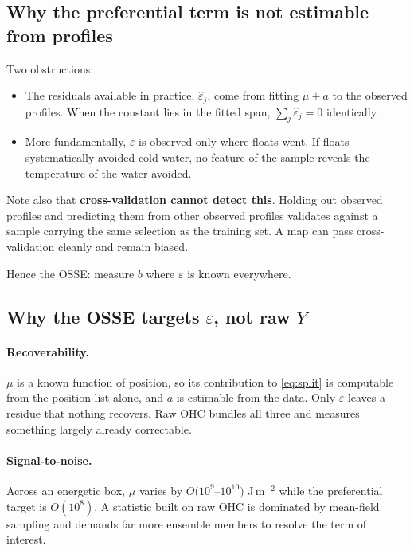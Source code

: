 \documentclass[11pt]{article}
\begin{document}
\subsection{Why the preferential term is not estimable from profiles}
\label{sec:notestimable}

Two obstructions:

\begin{itemize}[leftmargin=*]
  \item The residuals available in practice, $\hat\varepsilon_j$, come from fitting $\mu + a$
        to the observed profiles. When the constant lies in the fitted span,
        $\sum_j \hat\varepsilon_j = 0$ identically.
  \item More fundamentally, $\varepsilon$ is observed only where floats went. If floats
        systematically avoided cold water, no feature of the sample reveals the temperature of
        the water avoided.
\end{itemize}

Note also that \textbf{cross-validation cannot detect this}. Holding out observed profiles and
predicting them from other observed profiles validates against a sample carrying the same
selection as the training set. A map can pass cross-validation cleanly and remain biased.

Hence the OSSE: measure $b$ where $\varepsilon$ is known everywhere.

\subsection{Why the OSSE targets $\varepsilon$, not raw $Y$}
\label{sec:whyresidual}

\paragraph{Recoverability.} $\mu$ is a known function of position, so its contribution to
\eqref{eq:split} is computable from the position list alone, and $a$ is estimable from the
data. Only $\varepsilon$ leaves a residue that nothing recovers. Raw OHC bundles all three and
measures something largely already correctable.

\paragraph{Signal-to-noise.} Across an energetic box, $\mu$ varies by $O(10^{9}$--$10^{10})$
J\,m$^{-2}$ while the preferential target is $O(10^{8})$. A statistic built on raw OHC is
dominated by mean-field sampling and demands far more ensemble members to resolve the term of
interest.
\end{document}
